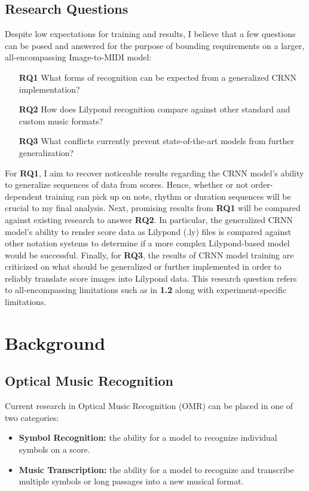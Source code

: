 \documentclass[nonacm, sigconf]{acmart}
\begin{document}
\subsection{Research Questions}

Despite low expectations for training and results, I believe that a few questions can be posed and answered for the purpose of bounding requirements on a larger, all-encompassing Image-to-MIDI model:

\begin{itemize}
	\item [\textbf{RQ1}] What forms of recognition can be expected from a generalized CRNN implementation?
	\item [\textbf{RQ2}] How does Lilypond recognition compare against other standard and custom music formats?
	\item [\textbf{RQ3}] What conflicts currently prevent state-of-the-art models from further generalization?
\end{itemize}

For \textbf{RQ1}, I aim to recover noticeable results regarding the CRNN model's ability to generalize sequences of data from scores.
Hence, whether or not order-dependent training can pick up on note, rhythm or duration sequences will be crucial to my final analysis.
Next, promising results from \textbf{RQ1} will be compared against existing research to answer \textbf{RQ2}. 
In particular, the generalized CRNN model's ability to render score data as Lilypond (.ly) files is compared against other notation systems to determine if a more complex Lilypond-based model would be successful.
Finally, for \textbf{RQ3}, the results of CRNN model training are criticized on what should be generalized or further implemented in order to reliably translate score images into Lilypond data.
This research question refers to all-encompassing limitations such as in \textbf{1.2} along with experiment-specific limitations.

\section{Background}
\subsection{Optical Music Recognition}
Current research in Optical Music Recognition (OMR) can be placed in one of two categories:

\begin{itemize}
	\item \textbf{Symbol Recognition:} the ability for a model to recognize individual symbols on a score.
	\item \textbf{Music Transcription:} the ability for a model to recognize and transcribe multiple symbols or long passages into a new musical format.
\end{itemize}
\end{document}

